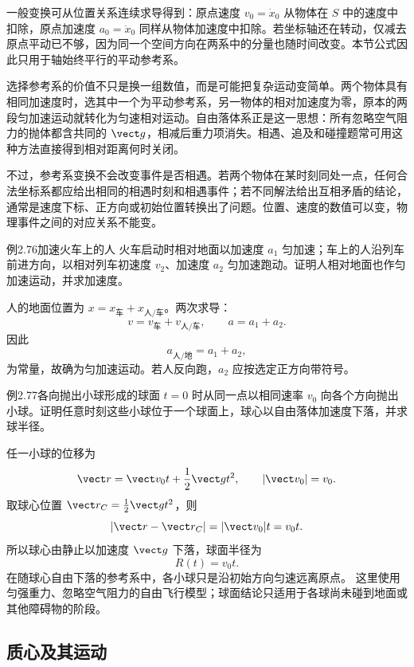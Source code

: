 一般变换可从位置关系连续求导得到：原点速度 $v_0=\dot x_0$ 从物体在 $S$ 中的速度中扣除，原点加速度 $a_0=\ddot x_0$ 同样从物体加速度中扣除。若坐标轴还在转动，仅减去原点平动已不够，因为同一个空间方向在两系中的分量也随时间改变。本节公式因此只用于轴始终平行的平动参考系。

选择参考系的价值不只是换一组数值，而是可能把复杂运动变简单。两个物体具有相同加速度时，选其中一个为平动参考系，另一物体的相对加速度为零，原本的两段匀加速运动就转化为匀速相对运动。自由落体系正是这一思想：所有忽略空气阻力的抛体都含共同的 $\vect g$，相减后重力项消失。相遇、追及和碰撞题常可用这种方法直接得到相对距离何时关闭。

不过，参考系变换不会改变事件是否相遇。若两个物体在某时刻同处一点，任何合法坐标系都应给出相同的相遇时刻和相遇事件；若不同解法给出互相矛盾的结论，通常是速度下标、正方向或初始位置转换出了问题。位置、速度的数值可以变，物理事件之间的对应关系不能变。

\begin{origexamplebox}{例2.76\quad 加速火车上的人}
火车启动时相对地面以加速度 $a_1$ 匀加速；车上的人沿列车前进方向，以相对列车初速度 $v_2$、加速度 $a_2$ 匀加速跑动。证明人相对地面也作匀加速运动，并求加速度。
\end{origexamplebox}
\begin{xesolution}
人的地面位置为 $x=x_{\text{车}}+x_{\text{人/车}}$。两次求导：
\[
v=v_{\text{车}}+v_{\text{人/车}},\qquad
a=a_1+a_2.
\]
因此
\[
\boxed{a_{\text{人/地}}=a_1+a_2},
\]
为常量，故确为匀加速运动。若人反向跑，$a_2$ 应按选定正方向带符号。
\end{xesolution}

\begin{origexamplebox}{例2.77\quad 各向抛出小球形成的球面}
$t=0$ 时从同一点以相同速率 $v_0$ 向各个方向抛出小球。证明任意时刻这些小球位于一个球面上，球心以自由落体加速度下落，并求球半径。
\end{origexamplebox}
\begin{xesolution}
任一小球的位移为
\[
\vect r=\vect v_0t+\frac12\vect g t^2,
\qquad |\vect v_0|=v_0.
\]
取球心位置 $\vect r_C=\frac12\vect g t^2$，则
\[
|\vect r-\vect r_C|=|\vect v_0|t=v_0t.
\]
所以球心由静止以加速度 $\vect g$ 下落，球面半径为
\[
\boxed{R(t)=v_0t}.
\]
在随球心自由下落的参考系中，各小球只是沿初始方向匀速远离原点。
这里使用匀强重力、忽略空气阻力的自由飞行模型；球面结论只适用于各球尚未碰到地面或其他障碍物的阶段。
\end{xesolution}

\subsection*{质心及其运动}


